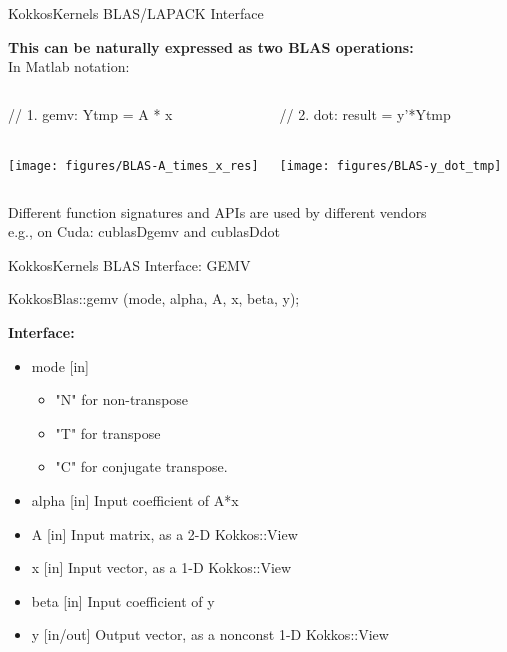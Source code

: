 \begin{frame}[fragile]{KokkosKernels BLAS/LAPACK Interface}

\textbf {This can be naturally expressed as two BLAS operations:} \\
In Matlab notation:
\vspace{-2em}

\begin{columns}[t,onlytextwidth]
  \begin{center}
  \begin{code}[keywords={double,parallel_reduce,for,int}]
     // 1. gemv:
     Ytmp = A * x
  \end{code}
  \\
  \texttt{[image: figures/BLAS-A\_times\_x\_res]}
  \end{center}


  \begin{center}
  \begin{code}[keywords={double,parallel_reduce,for,int}]
     // 2. dot:
     result = y'*Ytmp
  \end{code}
  \\
  \texttt{[image: figures/BLAS-y\_dot\_tmp]}
  \end{center}
\end{columns}
\vspace{5pt}
\small{Different function signatures and APIs are used by different vendors}
\\
\small{  e.g., on Cuda: cublasDgemv and cublasDdot}
\end{frame}


\begin{frame}[fragile]{KokkosKernels BLAS Interface: GEMV}


\begin{code}[basicstyle=\large, keywords={double,gemv,dot}]
KokkosBlas::gemv (mode, alpha, A, x, beta, y);
\end{code}

\textbf {Interface:}

\begin{itemize}
  \item mode [in] 
  \begin{itemize}
    \item "N" for non-transpose
    \item "T" for transpose
    \item "C" for conjugate transpose.
  \end{itemize}
  \item alpha [in] Input coefficient of A*x
  \item A [in] Input matrix, as a 2-D Kokkos::View
  \item x [in] Input vector, as a 1-D Kokkos::View
  \item beta [in] Input coefficient of y
  \item y [in/out] Output vector, as a nonconst 1-D Kokkos::View
\end{itemize}

\end{frame}

